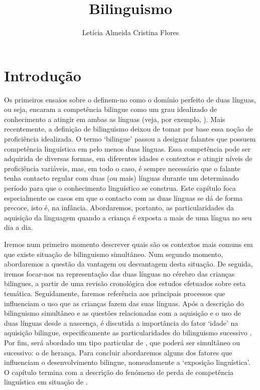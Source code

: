 \documentclass[output=paper]{LSP/langsci}
\author{Letícia Almeida\affiliation{Laboratoire Dynamique du Langage, UMR 5596, CNRS e Université Lyon 2}\lastand
Cristina Flores\affiliation{Universidade do Minho, CEHUM}
}
\title{Bilinguismo}
\begin{document}
\section{Introdução} 
\label{sec:almeida_intro}

Os primeiros ensaios sobre o  definem-no como o domínio perfeito de duas línguas, ou seja, encaram a competência bilingue como um grau idealizado de conhecimento a atingir em ambas as línguas (veja, por exemplo, \citealt{bloomfield1933}). Mais recentemente, a definição de bilinguismo deixou de tomar por base essa noção de proficiência idealizada. O termo `bilingue' passou a designar falantes que possuem competência linguística em pelo menos duas línguas. Essa competência pode ser adquirida de diversas formas, em diferentes idades e contextos e atingir níveis de proficiência variáveis, mas, em todo o caso, é sempre necessário que o falante tenha contacto regular com duas (ou mais) línguas durante um determinado período para que o conhecimento linguístico se construa. Este capítulo foca especialmente os casos em que o contacto com as duas línguas se dá de forma precoce, isto é, na infância. Abordaremos, portanto, as particularidades da aquisição da linguagem quando a criança é exposta a mais de uma língua no seu dia a dia.  

Iremos num primeiro momento descrever quais são os contextos mais comuns em que existe situação de bilinguismo simultâneo. Num segundo momento, abordaremos a questão da vantagem ou desvantagem desta situação. De seguida, iremos focar-nos na representação das duas línguas no cérebro das crianças bilingues, a partir de uma revisão cronológica dos estudos efetuados sobre esta temática. Seguidamente, faremos referência aos principais processos que influenciam o uso que as crianças fazem das suas línguas. Após a descrição do bilinguismo simultâneo e as questões relacionadas com a aquisição e o uso de duas línguas desde a nascença, é discutida a importância do fator `idade' na aquisição bilingue, especificamente as particularidades do bilinguismo sucessivo . Por fim, será abordado um tipo particular de , que poderá ser simultâneo ou sucessivo: o  de herança. Para concluir abordaremos alguns dos fatores que influenciam o desenvolvimento bilingue, nomeadamente a ‘exposição linguística’. O capítulo termina com a descrição do fenómeno de perda de competência linguística em situação de .  
\end{document}
